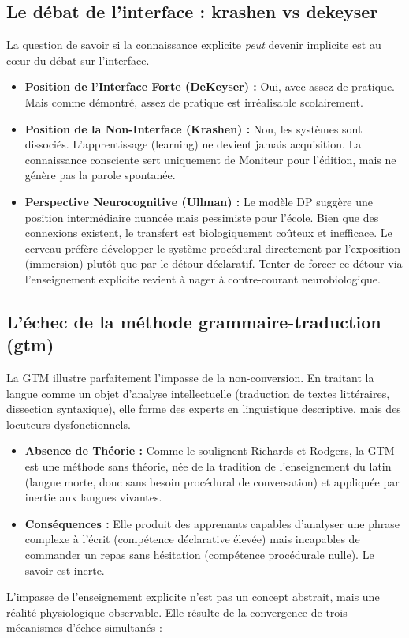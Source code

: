 \subsection{Le débat de l'interface : krashen vs dekeyser}

La question de savoir si la connaissance explicite \textit{peut} devenir implicite est au cœur du
débat sur l'interface.

\begin{itemize}\item \textbf{Position de l'Interface Forte (DeKeyser) :} Oui, avec assez de pratique. Mais comme démontré, \og assez de pratique\fg{} est irréalisable scolairement.\cite{II-2-2-ref45}\item \textbf{Position de la Non-Interface (Krashen) :} Non, les systèmes sont dissociés. L'apprentissage (learning) ne devient jamais acquisition. La connaissance consciente sert uniquement de Moniteur pour l'édition, mais ne génère pas la parole spontanée.\cite{II-2-2-ref23}\item \textbf{Perspective Neurocognitive (Ullman) :} Le modèle DP suggère une position intermédiaire nuancée mais pessimiste pour l'école. Bien que des connexions existent, le transfert est biologiquement coûteux et inefficace. Le cerveau préfère développer le système procédural directement par l'exposition (immersion) plutôt que par le détour déclaratif. Tenter de forcer ce détour via l'enseignement explicite revient à nager à contre-courant neurobiologique.\cite{II-2-2-ref2}\end{itemize}

\subsection{L'échec de la méthode grammaire-traduction (gtm)}

La GTM illustre parfaitement l'impasse de la non-conversion. En traitant la langue comme un objet
d'analyse intellectuelle (traduction de textes littéraires, dissection syntaxique), elle forme des
experts en linguistique descriptive, mais des locuteurs dysfonctionnels.

\begin{itemize}\item \textbf{Absence de Théorie :} Comme le soulignent Richards et Rodgers, la GTM est une méthode \og sans théorie\fg{}, née de la tradition de l'enseignement du latin (langue morte, donc sans besoin procédural de conversation) et appliquée par inertie aux langues vivantes.\cite{II-2-2-ref47}\item \textbf{Conséquences :} Elle produit des apprenants capables d'analyser une phrase complexe à l'écrit (compétence déclarative élevée) mais incapables de commander un repas sans hésitation (compétence procédurale nulle). Le savoir est \og inerte\fg{}.\cite{II-2-2-ref48}\end{itemize}L'impasse de l'enseignement explicite n'est pas un concept abstrait, mais une réalité physiologique
observable. Elle résulte de la convergence de trois mécanismes d'échec simultanés :

